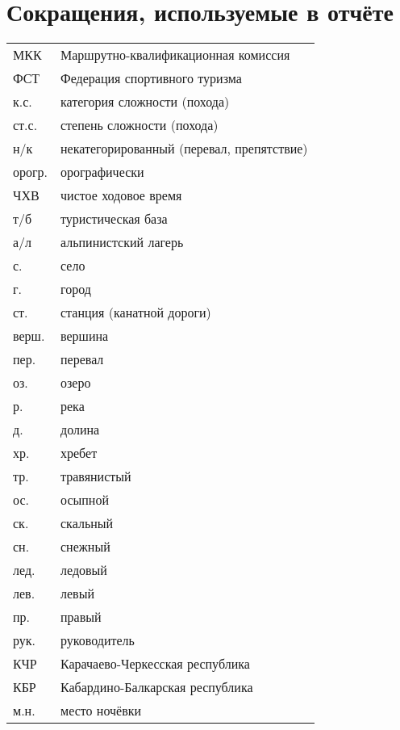 \section*{Сокращения, используемые в отчёте}
\begin{tabular}{p{} p{}}
	МКК                                  &   Маршрутно-квалификационная комиссия  \\
	ФСТ                                &   Федерация спортивного туризма  \\
	к.с.                               &   категория сложности (похода)  \\
	ст.с.							& степень сложности (похода) \\
	н/к                            &   некатегорированный (перевал, препятствие) \\
	орогр.                &   орографически  \\
	ЧХВ                          &   чистое ходовое время  \\
	т/б                         &   туристическая база \\
	а/л                  &   альпинистский лагерь \\
		с. & село \\
	г. & город \\
	ст. & станция (канатной дороги) \\
	верш.               &   вершина \\
	пер.               &   перевал \\
	оз.             &   озеро \\
	р.             &   река \\
	д.	&	долина\\
	хр. &   хребет \\
	тр. &   травянистый \\
	ос. &   осыпной \\
	ск. &   скальный \\
	сн. &   снежный \\
	лед. &   ледовый \\
	лев. &   левый \\
	пр. &   правый \\
	рук. &   руководитель \\	
	КЧР & Карачаево-Черкесская республика\\
	КБР & Кабардино-Балкарская республика\\
	м.н. & место ночёвки
\end{tabular}
\newpage